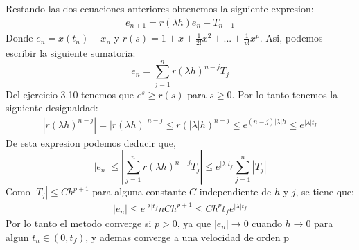 \begin{enumerate}
\begin{theorem}
			Restando las dos ecuaciones anteriores obtenemos la siguiente expresion:
			\begin{align*}
			e_{n+1} = r(\lambda h)e_n + T_{n+1}
			\end{align*}
			Donde  $e_n = x(t_n ) - x_n$ y $r(s) = 1 + x + \frac{1}{2!} x^2 + ... + \frac{1}{p!} x^p$. Asi, podemos escribir la siguiente sumatoria:
			\[
			e_n = \sum_{j = 1}^{n}r(\lambda h)^{n-j}T_{j}
			\]
			Del ejercicio 3.10 tenemos que $e^s \geq r(s)$ para $s\geq 0$. Por lo tanto tenemos la siguiente desigualdad:
			\begin{align*}
			|r(\lambda h)^{n-j}| = |r(\lambda h)|^{n-j}\leq r(|\lambda| h)^{n-j} \leq e^{(n-j)|\lambda|h} \leq e^{|\lambda|t_f}
			\end{align*}
			De esta expresion podemos deducir que,\\
			\[
			|e_n| \leq |\sum_{j = 1}^{n}r(\lambda h)^{n-j}T_{j}| \leq e^{|\lambda|t_f}\sum_{j = 1}^{n}|T_{j}|
			\]
			Como $|T_{j}|\leq Ch^{p+1}$ para alguna constante $C$ independiente de $h$ y $j$, se tiene que:
			\begin{align*}
			|e_n| \leq e^{|\lambda|t_f}nCh^{p+1} \leq Ch^pt_fe^{|\lambda|t_f}
			\end{align*}
			Por lo tanto el metodo converge si $p > 0$, ya que $|e_n| \longrightarrow 0$ cuando $h \longrightarrow 0$ para algun $t_n\in (0, t_f)$, y ademas converge a una
			velocidad de orden p
			
			
			
		
			
			
		\end{theorem}


\end{enumerate}
	